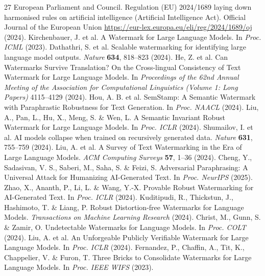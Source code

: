 \begin{thebibliography}{27}
\setcounter{enumiv}{0}
 European Parliament and Council. Regulation (EU) 2024/1689 laying down harmonised rules on artificial intelligence (Artificial Intelligence Act). Official Journal of the European Union \url{https://eur-lex.europa.eu/eli/reg/2024/1689/oj} (2024).
 Kirchenbauer, J. et al. A Watermark for Large Language Models. In \emph{Proc. ICML} (2023).
 Dathathri, S. et al. Scalable watermarking for identifying large language model outputs. \emph{Nature} \textbf{634}, 818–823 (2024).
 He, Z. et al. Can Watermarks Survive Translation? On the Cross-lingual Consistency of Text Watermark for Large Language Models. In \emph{Proceedings of the 62nd Annual Meeting of the Association for Computational Linguistics (Volume 1: Long Papers)} 4115–4129 (2024).
 Hou, A. B. et al. SemStamp: A Semantic Watermark with Paraphrastic Robustness for Text Generation. In \emph{Proc. NAACL} (2024).
 Liu, A., Pan, L., Hu, X., Meng, S. \& Wen, L. A Semantic Invariant Robust Watermark for Large Language Models. In \emph{Proc. ICLR} (2024).
 Shumailov, I. et al. AI models collapse when trained on recursively generated data. \emph{Nature} \textbf{631}, 755–759 (2024).
 Liu, A. et al. A Survey of Text Watermarking in the Era of Large Language Models. \emph{ACM Computing Surveys} \textbf{57}, 1–36 (2024).
 Cheng, Y., Sadasivan, V. S., Saberi, M., Saha, S. \& Feizi, S. Adversarial Paraphrasing: A Universal Attack for Humanizing AI-Generated Text. In \emph{Proc. NeurIPS} (2025).
 Zhao, X., Ananth, P., Li, L. \& Wang, Y.-X. Provable Robust Watermarking for AI-Generated Text. In \emph{Proc. ICLR} (2024).
 Kuditipudi, R., Thickstun, J., Hashimoto, T. \& Liang, P. Robust Distortion-free Watermarks for Language Models. \emph{Transactions on Machine Learning Research} (2024).
 Christ, M., Gunn, S. \& Zamir, O. Undetectable Watermarks for Language Models. In \emph{Proc. COLT} (2024).
 Liu, A. et al. An Unforgeable Publicly Verifiable Watermark for Large Language Models. In \emph{Proc. ICLR} (2024).
 Fernandez, P., Chaffin, A., Tit, K., Chappelier, V. \& Furon, T. Three Bricks to Consolidate Watermarks for Large Language Models. In \emph{Proc. IEEE WIFS} (2023).

\end{thebibliography}
